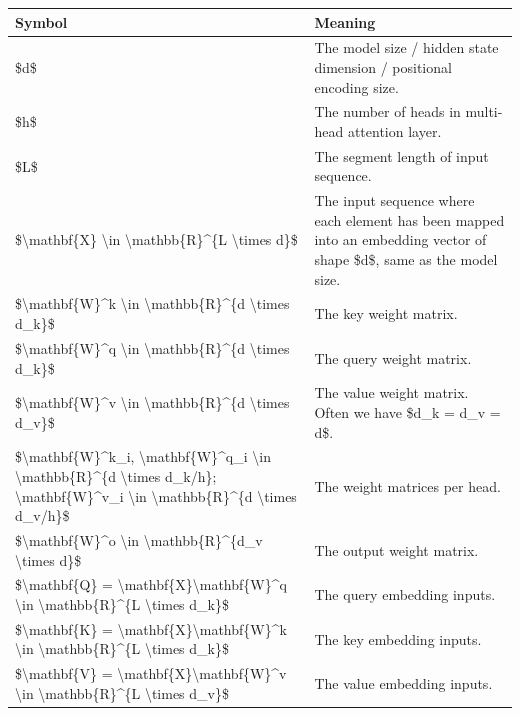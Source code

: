 \begin{longtable}[]{@{}ll@{}}
\toprule\noalign{}
Symbol & Meaning \\
\midrule\noalign{}
\endhead
\bottomrule\noalign{}
\endlastfoot
\$d\$ & The model size / hidden state dimension / positional encoding size. \\
\$h\$ & The number of heads in multi-head attention layer. \\
\$L\$ & The segment length of input sequence. \\
\$\textbackslash mathbf\{X\} \textbackslash in \textbackslash mathbb\{R\}\^{}\{L \textbackslash times d\}\$ & The input sequence where each element has been mapped into an embedding vector of shape \$d\$, same as the model size. \\
\$\textbackslash mathbf\{W\}\^{}k \textbackslash in \textbackslash mathbb\{R\}\^{}\{d \textbackslash times d\_k\}\$ & The key weight matrix. \\
\$\textbackslash mathbf\{W\}\^{}q \textbackslash in \textbackslash mathbb\{R\}\^{}\{d \textbackslash times d\_k\}\$ & The query weight matrix. \\
\$\textbackslash mathbf\{W\}\^{}v \textbackslash in \textbackslash mathbb\{R\}\^{}\{d \textbackslash times d\_v\}\$ & The value weight matrix. Often we have \$d\_k = d\_v = d\$. \\
\$\textbackslash mathbf\{W\}\^{}k\_i, \textbackslash mathbf\{W\}\^{}q\_i \textbackslash in \textbackslash mathbb\{R\}\^{}\{d \textbackslash times d\_k/h\}; \textbackslash mathbf\{W\}\^{}v\_i \textbackslash in \textbackslash mathbb\{R\}\^{}\{d \textbackslash times d\_v/h\}\$ & The weight matrices per head. \\
\$\textbackslash mathbf\{W\}\^{}o \textbackslash in \textbackslash mathbb\{R\}\^{}\{d\_v \textbackslash times d\}\$ & The output weight matrix. \\
\$\textbackslash mathbf\{Q\} = \textbackslash mathbf\{X\}\textbackslash mathbf\{W\}\^{}q \textbackslash in \textbackslash mathbb\{R\}\^{}\{L \textbackslash times d\_k\}\$ & The query embedding inputs. \\
\$\textbackslash mathbf\{K\} = \textbackslash mathbf\{X\}\textbackslash mathbf\{W\}\^{}k \textbackslash in \textbackslash mathbb\{R\}\^{}\{L \textbackslash times d\_k\}\$ & The key embedding inputs. \\
\$\textbackslash mathbf\{V\} = \textbackslash mathbf\{X\}\textbackslash mathbf\{W\}\^{}v \textbackslash in \textbackslash mathbb\{R\}\^{}\{L \textbackslash times d\_v\}\$ & The value embedding inputs. \\

\end{longtable}
